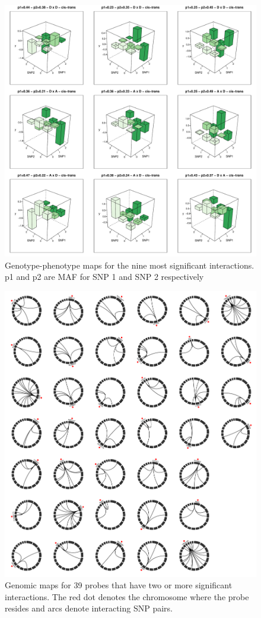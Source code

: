 \documentclass[paper=a4, fontsize=11pt]{scrartcl}	%
\numberwithin{equation}{section}									%
\numberwithin{figure}{section}										%
\numberwithin{table}{section}										%
\begin{document}
\begin{figure}[p]
	\centering
	\includegraphics[width=15cm]{images/3dplots}
	\caption{Genotype-phenotype maps for the nine most significant interactions. p1 and p2 are MAF for SNP 1 and SNP 2 respectively}
	\label{fig:3dplots}
\end{figure}

\begin{figure}[p]
	\centering
	\includegraphics[width=15cm]{images/circos}
	\caption{Genomic maps for 39 probes that have two or more significant interactions. The red dot denotes the chromosome where the probe resides and arcs denote interacting SNP pairs.}
	\label{fig:circos}
\end{figure}
\end{document}
